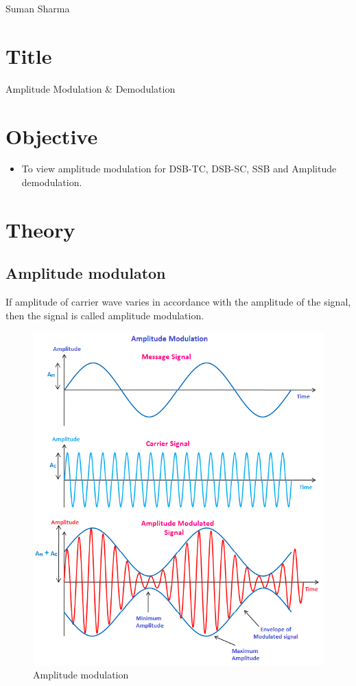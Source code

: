 \documentclass[a4paper,11pt]{article}
\begin{document}
{Suman Sharma}

\renewcommand{\contentsname}{Table of Contents}
\tableofcontents

\pagebreak
\lstlistoflistings
\vspace{10em}
\listoffigures
\pagebreak
{}

\section{Title} {\large Amplitude Modulation \& Demodulation}
\section{Objective}
\begin{itemize}
    \item To view amplitude modulation for DSB­-TC, DSB­-SC, SSB  and Amplitude demodulation.

\end{itemize}

\section{Theory}
\subsection{Amplitude modulaton}
If amplitude of carrier wave varies in accordance with the amplitude of the signal, then the signal is called amplitude modulation.
\begin{figure}[H]
    \centering
    \includegraphics[width=0.85\linewidth]{./FIG/amplmod.png}
    \caption{Amplitude modulation}
\end{figure}
\end{document}
